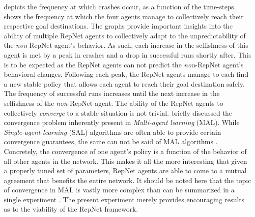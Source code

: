  depicts the frequency at which crashes occur, as a function of the time-steps.  shows the frequency at which the four agents manage to collectively reach their respective goal destinations. The graphs provide important insights into the ability of multiple RepNet agents to collectively adapt to the unpredictability of the \textit{non}-RepNet agent's behavior. As such, each increase in the selfishness of this agent is met by a peak in crashes and a drop in successful runs shortly after. This is to be expected as the RepNet agents can not predict the \textit{non}-RepNet agent's behavioral changes. Following each peak, the RepNet agents manage to each find a new stable policy that allows each agent to reach their goal destination safely. The frequency of successful runs increases until the next increase in the selfishness of the \textit{non}-RepNet agent. The ability of the RepNet agents to collectively \textit{converge} to a stable situation is not trivial.  briefly discussed the convergence problem inherently present in \textit{Multi-agent learning} (MAL). While \textit{Single-agent learning} (SAL) algorithms are often able to provide certain convergence guarantees, the same can not be said of MAL algorithms \cite{nonstation, convergence}. Concretely, the convergence of one agent's policy is a function of the behavior of all other agents in the network. This makes it all the more interesting that given a properly tuned set of parameters, RepNet agents are able to come to a mutual agreement that benefits the entire network. It should be noted here that the topic of convergence in MAL is vastly more complex than can be summarized in a single experiment \cite{reduce, reduce2, nonstation, convergence}. The present experiment merely provides encouraging results as to the viability of the RepNet framework.


